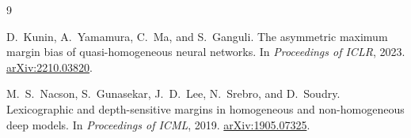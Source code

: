 \documentclass[11pt]{article}
\theoremstyle{plain}
\theoremstyle{definition}
\theoremstyle{remark}
\begin{document}
\begin{thebibliography}{9}

D.~Kunin, A.~Yamamura, C.~Ma, and S.~Ganguli.
The asymmetric maximum margin bias of quasi-homogeneous neural networks.
In \emph{Proceedings of ICLR}, 2023. \href{https://arxiv.org/abs/2210.03820}{arXiv:2210.03820}.

M.~S.~Nacson, S.~Gunasekar, J.~D.~Lee, N.~Srebro, and D.~Soudry.
Lexicographic and depth-sensitive margins in homogeneous and non-homogeneous deep models.
In \emph{Proceedings of ICML}, 2019. \href{https://arxiv.org/abs/1905.07325}{arXiv:1905.07325}.

\end{thebibliography}
\end{document}
